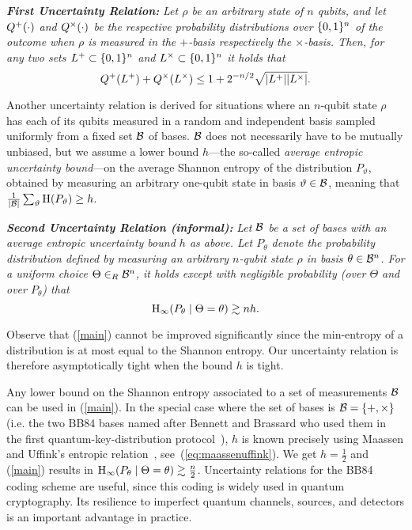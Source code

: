 \medskip
\noindent
{\bf {\em First Uncertainty Relation:}} {\em Let $\rho$ be an
  arbitrary state of $n$ qubits, and let $Q^{+}(\cdot)$ and $Q^{\times}(\cdot)$
  be the respective probability distributions over $\{0,1\}^n$ of the
  outcome when $\rho$ is measured in the $+$-basis respectively the
  $\times$-basis.  Then, for any two sets $L^+ \subset \{0,1\}^n$
  and $L^{\times} \subset \{0,1\}^n$ it holds that
\[ Q^{+}(L^+)+Q^{\times}(L^{\times}) \leq 1 + 2^{-n/2} \sqrt{|L^+|
  |L^{\times}|}. \] } 

Another uncertainty relation is derived
for situations where an $n$-qubit state $\rho$ has each of its qubits
measured in a random and independent basis sampled uniformly from a
fixed set ${\cal B}$ of bases.  ${\cal B}$ does not necessarily have
to be mutually unbiased, but we assume
a lower bound $h$---the so-called {\em {}average entropic uncertainty bound}---on the
average Shannon entropy of the distribution $P_{\vartheta}$, obtained
by measuring an arbitrary one-qubit state in basis $\vartheta \in
{\cal B}$, meaning that $\frac{1}{|{\cal B}|}\sum_{\vartheta}
\operatorname{H}(P_{\vartheta}) \geq h$.

\medskip
\noindent
{\bf {\em Second Uncertainty Relation (informal):}} {\em Let $\cal B$ be a
  set of bases with an average entropic uncertainty bound $h$ as
  above.  Let $P_{\theta}$ denote the probability distribution defined
  by measuring an arbitrary $n$-qubit state $\rho$ in basis $\theta
  \in {\cal B}^n$. For a uniform choice $\Theta \in_R {\cal B}^n$,
  it holds except with negligible probability (over $\Theta$ and over
  $P_{\theta}$) that %
\begin{equation}\label{main}
\operatorname{H}_{\infty}(P_\theta \mid \Theta=\theta) \gtrsim n h.
\end{equation}
} \medskip 

Observe that (\ref{main}) cannot be improved significantly since the
min-entropy of a distribution is at most equal to the Shannon entropy.
Our uncertainty relation is therefore asymptotically tight when the
bound $h$ is tight.

Any lower bound on the Shannon entropy associated to a set of
measurements ${\cal B}$ can be used in (\ref{main}).  In the special
case where the set of bases is ${\cal B}=\{+,\times\}$ (i.e. the two
BB84 bases named after Bennett and Brassard who used them in the first
quantum-key-distribution protocol~\cite{BB84}), 
$h$ is known precisely using Maassen and Uffink's
entropic relation~\cite{MU88}, see~(\ref{eq:maassenuffink}).  We
get $h=\frac{1}{2}$ and (\ref{main}) results in $\operatorname{H}_{\infty}(P_{\theta} \mid
\Theta=\theta) \gtrsim \frac{n}{2}$.
Uncertainty relations for the BB84 coding
scheme are useful, since this coding is widely used in
quantum cryptography.  Its resilience to imperfect quantum channels,
sources, and detectors is an important advantage in practice.


